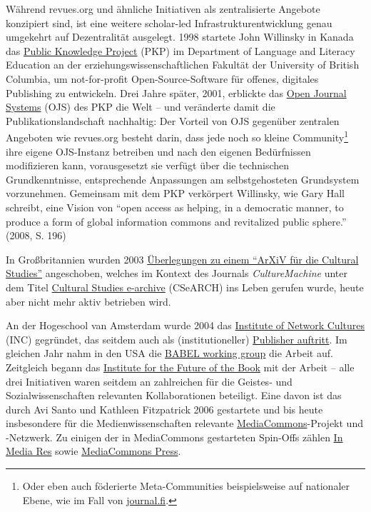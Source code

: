 \documentclass[a4paper,
fontsize=11pt,
oneside,
numbers=noperiodatend,
parskip=half-,
bibliography=totoc,
final
]{scrartcl}
\begin{document}
Während revues.org und ähnliche Initiativen als zentralisierte Angebote
konzipiert sind, ist eine weitere scholar-led Infrastrukturentwicklung
genau umgekehrt auf Dezentralität ausgelegt. 1998 startete John
Willinsky in Kanada das \href{https://pkp.sfu.ca/about/history/}{Public
Knowledge Project} (PKP) im Department of Language and Literacy
Education an der erziehungswissenschaftlichen Fakultät der University of
British Columbia, um not-for-profit Open-Source-Software für offenes,
digitales Publishing zu entwickeln. Drei Jahre später, 2001, erblickte
das \href{https://pkp.sfu.ca/ojs/}{Open Journal Systems} (OJS) des PKP
die Welt -- und veränderte damit die Publikationslandschaft nachhaltig:
Der Vorteil von OJS gegenüber zentralen Angeboten wie revues.org besteht
darin, dass jede noch so kleine Community\footnote{Oder eben auch
  föderierte Meta-Communities beispielsweise auf nationaler Ebene, wie
  im Fall von \href{https://journal.fi/}{journal.fi}.} ihre eigene
OJS-Instanz betreiben und nach den eigenen Bedürfnissen modifizieren
kann, vorausgesetzt sie verfügt über die technischen Grundkenntnisse,
entsprechende Anpassungen am selbstgehosteten Grundsystem vorzunehmen.
Gemeinsam mit dem PKP verkörpert Willinsky, wie Gary Hall schreibt, eine
Vision von \enquote{open access as helping, in a democratic manner, to
produce a form of global information commons and revitalized public
sphere.} (2008, S. 196)

In Großbritannien wurden 2003
\href{https://culturemachine.net/the-e-issue/cultural-studies-e-archive-project/}{Überlegungen
zu einem \enquote{ArXiV für die Cultural Studies}} angeschoben, welches
im Kontext des Journals \emph{CultureMachine} unter dem Titel
\href{https://web.archive.org/web/20080529134559/http://scm-rime.tees.ac.uk/VLE/DOMAIN/CSeArch/TABS/About.asp}{Cultural
Studies e-archive} (CSeARCH) ins Leben gerufen wurde, heute aber nicht
mehr aktiv betrieben wird.

An der Hogeschool van Amsterdam wurde 2004 das
\href{https://networkcultures.org/about/}{Institute of Network Cultures}
(INC) gegründet, das seitdem auch als (institutioneller)
\href{https://networkcultures.org/publications/}{Publisher auftritt}. Im
gleichen Jahr nahm in den USA die
\href{https://blogs.cofc.edu/babelworkinggroup/2005/07/}{BABEL working
group} die Arbeit auf. Zeitgleich begann das
\href{https://eliterature.org/2005/03/the-institute-for-the-future-of-the-book/}{Institute
for the Future of the Book} mit der Arbeit -- alle drei Initiativen
waren seitdem an zahlreichen für die Geistes- und Sozialwissenschaften
relevanten Kollaborationen beteiligt. Eine davon ist das durch Avi Santo
und Kathleen Fitzpatrick 2006 gestartete und bis heute insbesondere für
die Medienwissenschaften relevante
\href{https://mediacommons.org/about}{MediaCommons}-Projekt und
-Netzwerk. Zu einigen der in MediaCommons gestarteten Spin-Offs zählen
\href{https://mediacommons.org/imr/}{In Media Res} sowie
\href{https://mcpress.media-commons.org/}{MediaCommons Press}.
\end{document}
